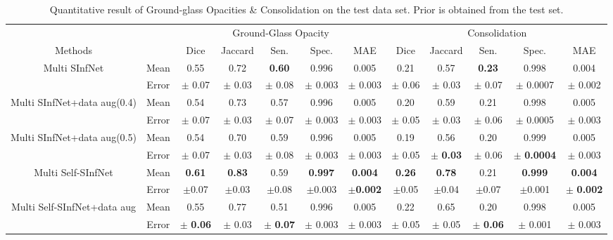 \begin{table}[!h]
	\centering
	\small
	\begin{tabular}{| c | c || c c c c c || c c c c c |}
		\hline
		& &\multicolumn{5}{c||}{Ground-Glass Opacity} & \multicolumn{5}{c|}{Consolidation}\\ \cline{3-12}
		Methods & & Dice & Jaccard & Sen. & Spec. & MAE & Dice & Jaccard & Sen. & Spec. & MAE \\\hline
		Multi SInfNet & Mean & 0.55 & 0.72 & \textbf{0.60} & 0.996 & 0.005 & 0.21 & 0.57  & \textbf{0.23}  &0.998  &0.004   \\ \cline{2-12}
		& Error & $\pm$ 0.07 & $\pm$ 0.03 & $\pm$ 0.08 & $\pm$ 0.003 & $\pm$ 0.003 & $\pm$ 0.06 & $\pm$ 0.03 & $\pm$ 0.07 & $\pm$ 0.0007 & $\pm$ 0.002 \\ \hline \hline
		
		Multi SInfNet+data aug(0.4) & Mean & 0.54 & 0.73 & 0.57 & 0.996 & 0.005 & 0.20 & 0.59 & 0.21 & 0.998 & 0.005  \\ \cline{2-12}
		& Error & $\pm$ 0.07 & $\pm$ 0.03 & $\pm$ 0.07 & $\pm$ 0.003 & $\pm$ 0.003 & $\pm$ 0.05 & $\pm$ 0.03 & $\pm$ 0.06 & $\pm$ 0.0005 & $\pm$ 0.003  \\ \hline \hline
		
		Multi SInfNet+data aug(0.5) & Mean & 0.54 & 0.70 & 0.59 & 0.996 & 0.005 & 0.19 & 0.56 & 0.20 & 0.999 & 0.005  \\ \cline{2-12}
		& Error & $\pm$ 0.07 & $\pm$ 0.03 & $\pm$ 0.08 & $\pm$ 0.003 & $\pm$ 0.003 & $\pm$ 0.05 & $\pm$ \textbf{0.03} & $\pm$ 0.06 & $\pm$ \textbf{0.0004} & $\pm$ 0.003  \\ \hline \hline

		Multi Self-SInfNet & Mean & \textbf{0.61} & \textbf{0.83} & 0.59 & \textbf{0.997} & \textbf{0.004} & \textbf{0.26} & \textbf{0.78} & 0.21 & \textbf{0.999} & \textbf{0.004}  \\ \cline{2-12}
		& Error & $\pm$0.07 & $\pm$0.03 & $\pm$0.08 & $\pm$0.003 & $\pm$\textbf{0.002} & $\pm$0.05 & $\pm$0.04 &$\pm$0.07 & $\pm$0.001 &$\pm$ \textbf{0.002}  \\ \hline \hline
		
		Multi Self-SInfNet+data aug & Mean & 0.55 & 0.77 & 0.51 & 0.996 & 0.005 & 0.22 & 0.65 & 0.20 & 0.998 & 0.005  \\ \cline{2-12}
		& Error & $\pm$ \textbf{0.06} & $\pm$ 0.03 & $\pm$ \textbf{0.07} & $\pm$ 0.003 & $\pm$ 0.003 & $\pm$ 0.05 & $\pm$ 0.05 & $\pm$ \textbf{0.06} & $\pm$ 0.001 & $\pm$ 0.003  \\ \hline \hline
	\end{tabular}
	\caption{Quantitative result of Ground-glass Opacities \& Consolidation on the test data set. Prior is obtained from the test set.}
	\label{tab:multi-strongprior}
\end{table}


